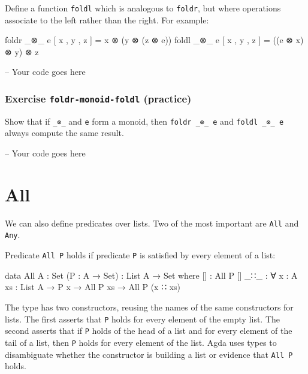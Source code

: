 Define a function \texttt{foldl} which is analogous to \texttt{foldr},
but where operations associate to the left rather than the right. For
example:

\begin{myDisplay}
foldr _⊗_ e [ x , y , z ]  =  x ⊗ (y ⊗ (z ⊗ e))
foldl _⊗_ e [ x , y , z ]  =  ((e ⊗ x) ⊗ y) ⊗ z
\end{myDisplay}

\begin{fence}
\begin{code}
-- Your code goes here
\end{code}
\end{fence}

\hypertarget{exercise-foldr-monoid-foldl-practice}{%
\subsubsection{\texorpdfstring{Exercise \texttt{foldr-monoid-foldl}
(practice)}{Exercise foldr-monoid-foldl (practice)}}\label{exercise-foldr-monoid-foldl-practice}}

Show that if \texttt{\_⊗\_} and \texttt{e} form a monoid, then
\texttt{foldr\ \_⊗\_\ e} and \texttt{foldl\ \_⊗\_\ e} always compute the
same result.

\begin{fence}
\begin{code}
-- Your code goes here
\end{code}
\end{fence}

\hypertarget{Lists-All}{%
\section{All}\label{Lists-All}}

We can also define predicates over lists. Two of the most important are
\texttt{All} and \texttt{Any}.

Predicate \texttt{All\ P} holds if predicate \texttt{P} is satisfied by
every element of a list:

\begin{fence}
\begin{code}
data All {A : Set} (P : A → Set) : List A → Set where
  []  : All P []
  _∷_ : ∀ {x : A} {xs : List A} → P x → All P xs → All P (x ∷ xs)
\end{code}
\end{fence}

The type has two constructors, reusing the names of the same
constructors for lists. The first asserts that \texttt{P} holds for
every element of the empty list. The second asserts that if \texttt{P}
holds of the head of a list and for every element of the tail of a list,
then \texttt{P} holds for every element of the list. Agda uses types to
disambiguate whether the constructor is building a list or evidence that
\texttt{All\ P} holds.

